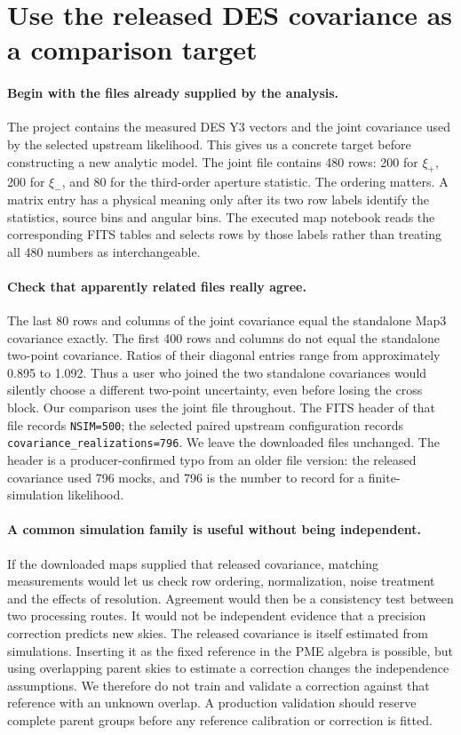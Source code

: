 \documentclass[11pt]{article}
\begin{document}
\section{Use the released DES covariance as a comparison target}
\paragraph{Begin with the files already supplied by the analysis.}
The project contains the measured DES Y3 vectors and the joint covariance
used by the selected upstream likelihood. This gives us a concrete target
before constructing a new analytic model. The joint file contains 480 rows:
200 for $\xi_+$, 200 for $\xi_-$, and 80 for the third-order aperture statistic.
The ordering matters. A matrix entry has a physical meaning only after its
two row labels identify the statistics, source bins and angular bins.
The executed map notebook reads the corresponding FITS tables and selects
rows by those labels rather than treating all 480 numbers as interchangeable.

\paragraph{Check that apparently related files really agree.}
The last 80 rows and columns of the joint covariance equal the standalone
Map3 covariance exactly. The first 400 rows and columns do not equal the
standalone two-point covariance. Ratios of their diagonal entries range
from approximately 0.895 to 1.092. Thus a user who joined the two standalone
covariances would silently choose a different two-point uncertainty, even
before losing the cross block. Our comparison uses the joint file throughout.
The FITS header of that file records \texttt{NSIM=500}; the selected paired
upstream configuration records \texttt{covariance\_realizations=796}.
We leave the downloaded files unchanged. The header is a
producer-confirmed typo from an older file version: the released
covariance used 796 mocks, and 796 is the number to record for a
finite-simulation likelihood.

\paragraph{A common simulation family is useful without being independent.}
If the downloaded maps supplied that released covariance, matching
measurements would let us check row ordering, normalization, noise treatment
and the effects of resolution. Agreement would then be a consistency test
between two processing routes. It would not be independent evidence that a
precision correction predicts new skies. The released covariance is itself
estimated from simulations. Inserting it as the fixed reference in the
PME algebra is possible, but using overlapping parent skies to estimate a
correction changes the independence assumptions. We therefore do not train
and validate a correction against that reference with an unknown overlap.
A production validation should reserve complete parent groups before any
reference calibration or correction is fitted.
\end{document}
